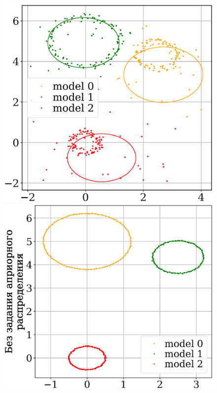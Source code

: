 \documentclass[12pt, twoside]{article}
\numberwithin{equation}{section}
\begin{document}
\begin{figure}[h!]
\begin{minipage}{.32\textwidth}
\end{minipage}
\begin{minipage}{.32\textwidth}
\vspace{-3mm}
\hspace{-8.5mm}
      \includegraphics[width =  1.07\textwidth]{figures/902.eps}
\end{minipage}
\begin{minipage}{.32\textwidth}
      \includegraphics[width =  \textwidth]{figures/900.eps}

\end{minipage}
\end{figure}
\end{document}
